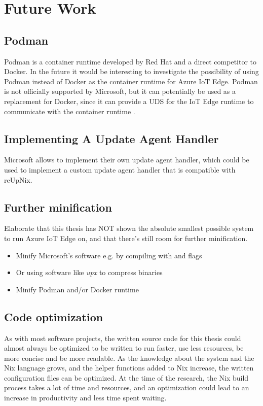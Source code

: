 \section{Future Work}

\subsection{Podman}
Podman is a container runtime developed by Red Hat and a direct competitor to Docker.
In the future it would be interesting to investigate the possibility of using
Podman instead of Docker as the container runtime for Azure IoT Edge. Podman is
not officially supported by Microsoft, but it can potentially be used as a
replacement for Docker, since it can provide a \ac{UDS} for the IoT Edge runtime
to communicate with the container runtime \cite{book:3556946,msdoc-supportetplatforms}.

\subsection{Implementing A Update Agent Handler}
\begin{tcolorbox}[title=TODO]
Microsoft allows to implement their own update agent handler, which could be
used to implement a custom update agent handler that is compatible with reUpNix.
\end{tcolorbox}

\subsection{Further minification}
\begin{tcolorbox}[title=TODO]
Elaborate that this thesis has NOT shown the absolute smallest possible system
to run Azure IoT Edge on, and that there's still room for further minification.
\begin{itemize}
    \item Minify Microsoft's software e.g. by compiling with  and  flags
    \item Or using software like \textit{upx} to compress binaries
    \item Minify Podman and/or Docker runtime
\end{itemize}
\end{tcolorbox}

\subsection{Code optimization}
As with most software projects, the written source code for this thesis could
almost always be optimized to be written to run faster, use less resources, be
more concise and be more readable. As the knowledge about the system and the
Nix language grows, and the helper functions added to Nix increase, the
written configuration files can be optimized. At the time of the research, the
Nix build process takes a lot of time and resources, and an optimization could
lead to an increase in productivity and less time spent waiting.
